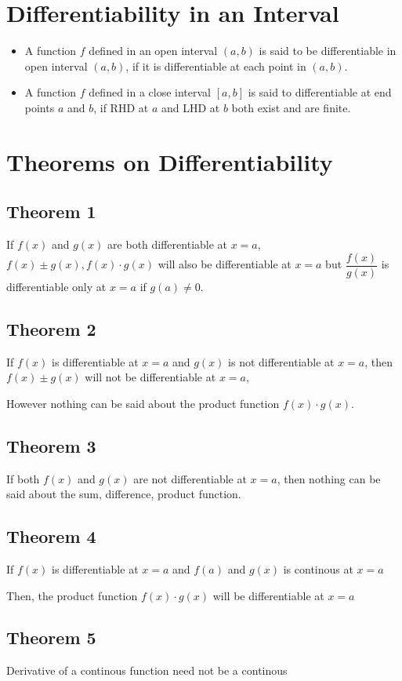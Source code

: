 \documentclass{article}
\begin{document}
\section{Differentiability in an Interval}
\begin{itemize}
    \item A function $f$ defined in an open interval $(a,b)$ is said to be differentiable in open interval $(a,b)$, if it is differentiable at each point in $(a,b)$.
    \item A function $f$ defined in a close interval $[a,b]$ is said to differentiable at end points $a$ and $b$, if RHD at $a$ and LHD at $b$ both exist and are finite. 
\end{itemize}

\section{Theorems on Differentiability}
\subsection{Theorem 1}
If $f(x)$ and $g(x)$ are both differentiable at $x=a$, $f(x) \pm g(x), f(x) \cdot g(x)$ will also be differentiable at $x=a$ but $\dfrac{f(x)}{g(x)}$ is differentiable only at $x=a$ if $g(a) \not= 0$.

\subsection{Theorem 2}
If $f(x)$ is differentiable at $x=a$ and $g(x)$ is not differentiable at $x=a$, then $f(x) \pm g(x)$ will not be differentiable at $x=a$, 

However nothing can be said about the product function $f(x) \cdot g(x)$.

\subsection{Theorem 3}
If both $f(x)$ and $g(x)$ are not differentiable at $x=a$, then nothing can be said about the sum, difference, product function.

\subsection{Theorem 4}
If $f(x)$ is differentiable at $x=a$ and $f(a)$ and $g(x)$ is continous at $x=a$

Then, the product function $f(x) \cdot g(x)$ will be differentiable at $x=a$

\subsection{Theorem 5}
Derivative of a continous function need not be a continous 
\end{document}

